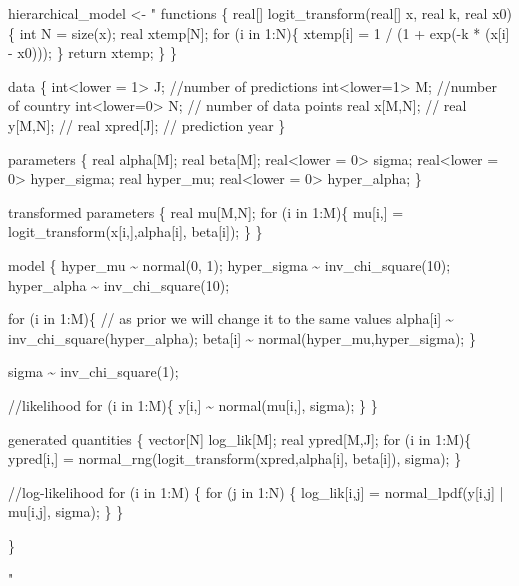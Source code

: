 \documentclass[
]{article}
\newenvironment{Shaded}{\begin{snugshade}}{\end{snugshade}}
\newcommand{\NormalTok}[1]{#1}
\newcommand{\OtherTok}[1]{\textcolor[rgb]{0.56,0.35,0.01}{#1}}
\newcommand{\StringTok}[1]{\textcolor[rgb]{0.31,0.60,0.02}{#1}}
\begin{document}
\begin{Shaded}
\begin{Highlighting}[]
\NormalTok{hierarchical\_model }\OtherTok{\textless{}{-}} \StringTok{"}
\StringTok{functions \{}
\StringTok{  real[] logit\_transform(real[] x, real k, real x0) \{}
\StringTok{    int N = size(x);}
\StringTok{    real xtemp[N];}
\StringTok{    for (i in 1:N)\{}
\StringTok{      xtemp[i] = 1 / (1 + exp({-}k * (x[i] {-} x0)));}
\StringTok{    \}}
\StringTok{     return xtemp;}
\StringTok{  \}}
\StringTok{\}}

\StringTok{data \{}
\StringTok{    int\textless{}lower = 1\textgreater{} J; //number of predictions}
\StringTok{    int\textless{}lower=1\textgreater{} M; //number of country}
\StringTok{    int\textless{}lower=0\textgreater{} N; // number of data points}
\StringTok{    real x[M,N]; //}
\StringTok{    real y[M,N]; //}
\StringTok{    real xpred[J];  // prediction year}
\StringTok{\}}

\StringTok{parameters \{}
\StringTok{  real alpha[M];}
\StringTok{  real beta[M];}
\StringTok{  real\textless{}lower = 0\textgreater{} sigma;}
\StringTok{  real\textless{}lower = 0\textgreater{} hyper\_sigma;}
\StringTok{  real hyper\_mu;}
\StringTok{  real\textless{}lower = 0\textgreater{} hyper\_alpha;}
\StringTok{\}}

\StringTok{transformed parameters \{}
\StringTok{  real mu[M,N];}
\StringTok{  for (i in 1:M)\{}
\StringTok{    mu[i,] = logit\_transform(x[i,],alpha[i], beta[i]);}
\StringTok{  \}}
\StringTok{\}}

\StringTok{model \{}
\StringTok{    hyper\_mu \textasciitilde{} normal(0, 1);}
\StringTok{    hyper\_sigma \textasciitilde{} inv\_chi\_square(10);}
\StringTok{    hyper\_alpha \textasciitilde{} inv\_chi\_square(10);}

\StringTok{  for (i in 1:M)\{}
\StringTok{    // as prior we will change it to the same values}
\StringTok{    alpha[i] \textasciitilde{} inv\_chi\_square(hyper\_alpha);}
\StringTok{    beta[i] \textasciitilde{} normal(hyper\_mu,hyper\_sigma);}
\StringTok{  \}}

\StringTok{  sigma \textasciitilde{} inv\_chi\_square(1);}

\StringTok{  //likelihood}
\StringTok{  for (i in 1:M)\{}
\StringTok{    y[i,] \textasciitilde{} normal(mu[i,], sigma);}
\StringTok{  \}}
\StringTok{\}}

\StringTok{generated quantities \{}
\StringTok{  vector[N] log\_lik[M];}
\StringTok{  real ypred[M,J];}
\StringTok{  for (i in 1:M)\{}
\StringTok{    ypred[i,] = normal\_rng(logit\_transform(xpred,alpha[i], beta[i]), sigma);}
\StringTok{  \}}

\StringTok{  //log{-}likelihood}
\StringTok{  for (i in 1:M) \{}
\StringTok{    for (j in 1:N) \{}
\StringTok{    log\_lik[i,j] = normal\_lpdf(y[i,j] | mu[i,j], sigma);}
\StringTok{    \}}
\StringTok{  \}}

\StringTok{\}}

\StringTok{"}
\end{Highlighting}
\end{Shaded}
\end{document}
